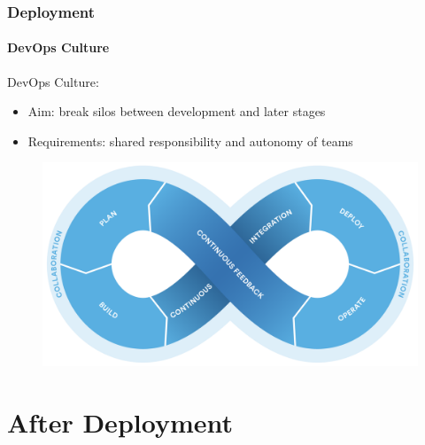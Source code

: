 \documentclass{beamer}
\begin{document}
\begin{frame}
	\frametitle{Deployment}
	\framesubtitle{DevOps Culture}

DevOps Culture:
	\begin{itemize}
		\item Aim: break silos between development and later stages 
		\item Requirements: shared responsibility and autonomy of teams
	\end{itemize}
	\begin{figure}
		\begin{center}
 			\includegraphics[scale=0.12]{devopsloop}
		\end{center}
	\end{figure}

\end{frame}


\section{After Deployment}
\end{document}
